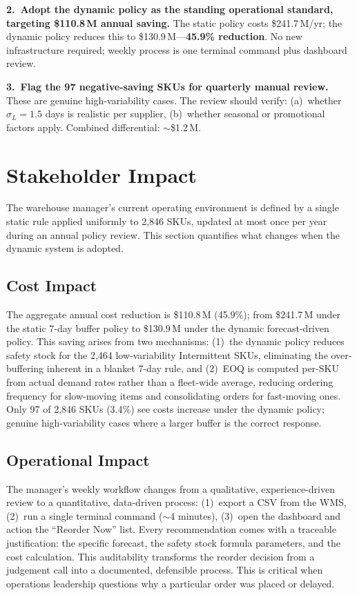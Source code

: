 \documentclass[11pt,letterpaper]{article}
\begin{document}
\textbf{2.~Adopt the dynamic policy as the standing operational standard, targeting \$110.8\,M annual saving.} The static policy costs \$241.7\,M/yr; the dynamic policy reduces this to \$130.9\,M---\textbf{45.9\% reduction}. No new infrastructure required; weekly process is one terminal command plus dashboard review.

\textbf{3.~Flag the 97 negative-saving SKUs for quarterly manual review.} These are genuine high-variability cases. The review should verify: (a)~whether $\sigma_L = 1.5$ days is realistic per supplier, (b)~whether seasonal or promotional factors apply. Combined differential: $\sim$\$1.2\,M.


\section{Stakeholder Impact}
\label{sec:impact}

The warehouse manager's current operating environment is defined by a single static rule applied uniformly to 2,846 SKUs, updated at most once per year during an annual policy review. This section quantifies what changes when the dynamic system is adopted.

\subsection{Cost Impact}

The aggregate annual cost reduction is \$110.8\,M (45.9\%); from \$241.7\,M under the static 7-day buffer policy to \$130.9\,M under the dynamic forecast-driven policy. This saving arises from two mechanisms: (1)~the dynamic policy reduces safety stock for the 2,464 low-variability Intermittent SKUs, eliminating the over-buffering inherent in a blanket 7-day rule, and (2)~EOQ is computed per-SKU from actual demand rates rather than a fleet-wide average, reducing ordering frequency for slow-moving items and consolidating orders for fast-moving ones. Only 97 of 2,846 SKUs (3.4\%) see costs increase under the dynamic policy; genuine high-variability cases where a larger buffer is the correct response.

\subsection{Operational Impact}

The manager's weekly workflow changes from a qualitative, experience-driven review to a quantitative, data-driven process: (1)~export a CSV from the WMS, (2)~run a single terminal command ($\sim$4 minutes), (3)~open the dashboard and action the ``Reorder Now'' list. Every recommendation comes with a traceable justification: the specific forecast, the safety stock formula parameters, and the cost calculation. This auditability transforms the reorder decision from a judgement call into a documented, defensible process. This is critical when operations leadership questions why a particular order was placed or delayed.
\end{document}

